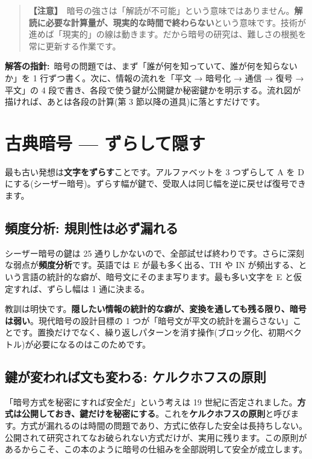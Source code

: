 \documentclass{article}
\begin{document}
\begin{quote}
\textbf{【注意】}\ 暗号の強さは「解読が不可能」という意味ではありません。\textbf{解読に必要な計算量が、現実的な時間で終わらない}という意味です。技術が進めば「現実的」の線は動きます。だから暗号の研究は、難しさの根拠を常に更新する作業です。
\end{quote}

\textbf{解答の指針:}\ 暗号の問題では、まず「誰が何を知っていて、誰が何を知らないか」を 1 行ずつ書く。次に、情報の流れを「平文 → 暗号化 → 通信 → 復号 → 平文」の 4 段で書き、各段で使う鍵が公開鍵か秘密鍵かを明示する。流れ図が描ければ、あとは各段の計算(第 3 節以降の道具)に落とすだけです。

\section{古典暗号 — ずらして隠す}

最も古い発想は\textbf{文字をずらす}ことです。アルファベットを 3 つずらして A を D にする(シーザー暗号)。ずらす幅が鍵で、受取人は同じ幅を逆に戻せば復号できます。

\subsection{頻度分析: 規則性は必ず漏れる}

シーザー暗号の鍵は 25 通りしかないので、全部試せば終わりです。さらに深刻な弱点が\textbf{頻度分析}です。英語では E が最も多く出る、TH や IN が頻出する、という言語の統計的な癖が、暗号文にそのまま写ります。最も多い文字を E と仮定すれば、ずらし幅は 1 通に決まる。

教訓は明快です。\textbf{隠したい情報の統計的な癖が、変換を通しても残る限り、暗号は弱い}。現代暗号の設計目標の 1 つが「暗号文が平文の統計を漏らさない」ことです。置換だけでなく、繰り返しパターンを消す操作(ブロック化、初期ベクトル)が必要になるのはこのためです。

\subsection{鍵が変われば文も変わる: ケルクホフスの原則}

「暗号方式を秘密にすれば安全だ」という考えは 19 世紀に否定されました。\textbf{方式は公開しておき、鍵だけを秘密にする}。これを\textbf{ケルクホフスの原則}と呼びます。方式が漏れるのは時間の問題であり、方式に依存した安全は長持ちしない。公開されて研究されてなお破られない方式だけが、実用に残ります。この原則があるからこそ、この本のように暗号の仕組みを全部説明して安全が成立します。
\end{document}

